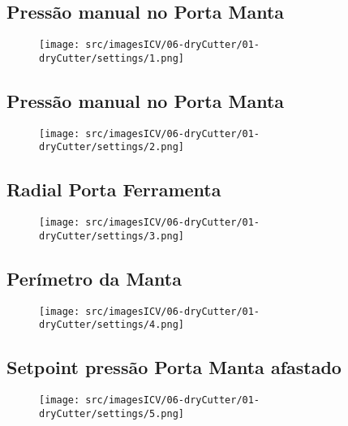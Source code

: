 
\thispagestyle{fancy}
\vspace{\fill}
\subsection{Pressão manual no Porta Manta}
\begin{figure}
    \centering
    \texttt{[image: src/imagesICV/06-dryCutter/01-dryCutter/settings/1.png]}
\end{figure}

\newpage
\thispagestyle{fancy}
\vspace{\fill}
\subsection{Pressão manual no Porta Manta}
\begin{figure}
    \centering
    \texttt{[image: src/imagesICV/06-dryCutter/01-dryCutter/settings/2.png]}
\end{figure}

\newpage
\thispagestyle{fancy}
\vspace{\fill}
\subsection{Radial Porta Ferramenta}
\begin{figure}
    \centering
    \texttt{[image: src/imagesICV/06-dryCutter/01-dryCutter/settings/3.png]}
\end{figure}

\newpage
\thispagestyle{fancy}
\vspace{\fill}
\subsection{Perímetro da Manta}
\begin{figure}
    \centering
    \texttt{[image: src/imagesICV/06-dryCutter/01-dryCutter/settings/4.png]}
\end{figure}

\newpage
\thispagestyle{fancy}
\vspace{\fill}
\subsection{Setpoint pressão Porta Manta afastado}
\begin{figure}
    \centering
    \texttt{[image: src/imagesICV/06-dryCutter/01-dryCutter/settings/5.png]}
\end{figure}

